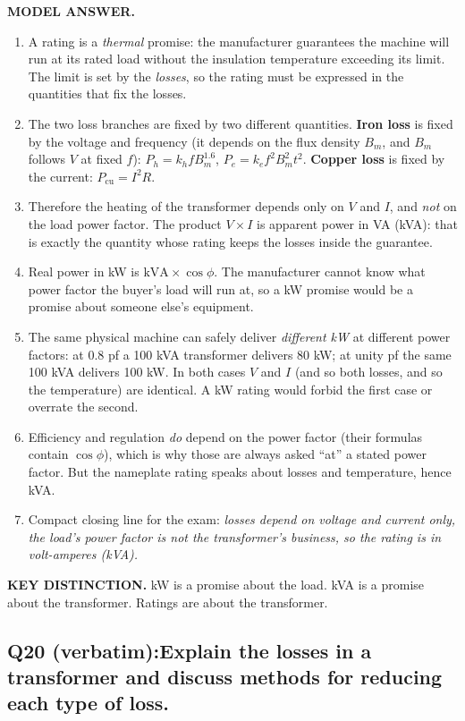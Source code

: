 \documentclass[11pt]{article}
\newcommand{\qhead}[2]{\subsection*{\color{copper}#1\quad\color{iron}#2}}
\newcommand{\tagline}[1]{\textbf{\color{copper}#1}}
\newcommand{\keydist}[1]{\vspace{2pt}\textbf{\color{red}KEY DISTINCTION.} #1}
\begin{document}
\tagline{MODEL ANSWER.}
\begin{enumerate}[label=\arabic*.]
\item A rating is a \emph{thermal} promise: the manufacturer guarantees the machine will run at its rated load without the insulation temperature exceeding its limit. The limit is set by the \emph{losses}, so the rating must be expressed in the quantities that fix the losses.
\item The two loss branches are fixed by two different quantities. \textbf{Iron loss} is fixed by the voltage and frequency (it depends on the flux density $B_m$, and $B_m$ follows $V$ at fixed $f$): $P_h = k_h f B_m^{1.6}$, $P_e = k_e f^{2} B_m^{2} t^{2}$. \textbf{Copper loss} is fixed by the current: $P_{\text{cu}} = I^{2} R$.
\item Therefore the heating of the transformer depends only on $V$ and $I$, and \emph{not} on the load power factor. The product $V \times I$ is apparent power in VA (kVA): that is exactly the quantity whose rating keeps the losses inside the guarantee.
\item Real power in kW is $\text{kVA} \times \cos\phi$. The manufacturer cannot know what power factor the buyer's load will run at, so a kW promise would be a promise about someone else's equipment.
\item The same physical machine can safely deliver \emph{different kW} at different power factors: at 0.8 pf a 100 kVA transformer delivers 80 kW; at unity pf the same 100 kVA delivers 100 kW. In both cases $V$ and $I$ (and so both losses, and so the temperature) are identical. A kW rating would forbid the first case or overrate the second.
\item Efficiency and regulation \emph{do} depend on the power factor (their formulas contain $\cos\phi$), which is why those are always asked ``at'' a stated power factor. But the nameplate rating speaks about losses and temperature, hence kVA.
\item Compact closing line for the exam: \emph{losses depend on voltage and current only, the load's power factor is not the transformer's business, so the rating is in volt-amperes (kVA).}
\end{enumerate}

\keydist{kW is a promise about the load. kVA is a promise about the transformer. Ratings are about the transformer.}

\qhead{Q20 (verbatim):}{Explain the losses in a transformer and discuss methods for reducing each type of loss.}
\end{document}
